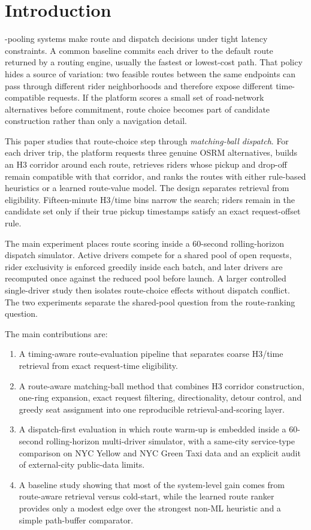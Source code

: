 \documentclass[journal]{IEEEtran}
\begin{document}
\section{Introduction}
-pooling systems make route and dispatch decisions under tight latency constraints. A common baseline commits each driver to the default route returned by a routing engine, usually the fastest or lowest-cost path. That policy hides a source of variation: two feasible routes between the same endpoints can pass through different rider neighborhoods and therefore expose different time-compatible requests. If the platform scores a small set of road-network alternatives before commitment, route choice becomes part of candidate construction rather than only a navigation detail.

This paper studies that route-choice step through \emph{matching-ball dispatch}. For each driver trip, the platform requests three genuine OSRM alternatives, builds an H3 corridor around each route, retrieves riders whose pickup and drop-off remain compatible with that corridor, and ranks the routes with either rule-based heuristics or a learned route-value model. The design separates retrieval from eligibility. Fifteen-minute H3/time bins narrow the search; riders remain in the candidate set only if their true pickup timestamps satisfy an exact request-offset rule.

The main experiment places route scoring inside a 60-second rolling-horizon dispatch simulator. Active drivers compete for a shared pool of open requests, rider exclusivity is enforced greedily inside each batch, and later drivers are recomputed once against the reduced pool before launch. A larger controlled single-driver study then isolates route-choice effects without dispatch conflict. The two experiments separate the shared-pool question from the route-ranking question.

The main contributions are:
\begin{enumerate}
    \item A timing-aware route-evaluation pipeline that separates coarse H3/time retrieval from exact request-time eligibility.
    \item A route-aware matching-ball method that combines H3 corridor construction, one-ring expansion, exact request filtering, directionality, detour control, and greedy seat assignment into one reproducible retrieval-and-scoring layer.
    \item A dispatch-first evaluation in which route warm-up is embedded inside a 60-second rolling-horizon multi-driver simulator, with a same-city service-type comparison on NYC Yellow and NYC Green Taxi data and an explicit audit of external-city public-data limits.
    \item A baseline study showing that most of the system-level gain comes from route-aware retrieval versus cold-start, while the learned route ranker provides only a modest edge over the strongest non-ML heuristic and a simple path-buffer comparator.
\end{enumerate}
\end{document}
